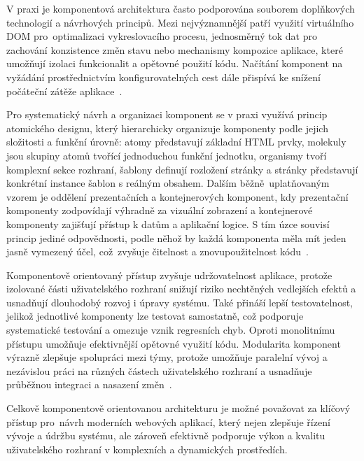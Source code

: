 V praxi je komponentová architektura často podporována souborem doplňkových technologií a návrhových principů. Mezi nejvýznamnější patří využití virtuálního DOM pro~optimalizaci vykreslovacího procesu, jednosměrný tok dat pro zachování konzistence změn stavu nebo mechanismy kompozice aplikace, které umožňují izolaci funkcionalit a opětovné použití kódu. Načítání komponent na vyžádání prostřednictvím konfigurovatelných cest dále přispívá ke snížení počáteční zátěže aplikace~\cite{ComponentArch}.

Pro systematický návrh a organizaci komponent se v praxi využívá princip atomického designu, který hierarchicky organizuje komponenty podle jejich složitosti a funkční úrovně: atomy představují základní HTML prvky, molekuly jsou skupiny atomů tvořící jednoduchou funkční jednotku, organismy tvoří komplexní sekce rozhraní, šablony definují rozložení stránky a stránky představují konkrétní instance šablon s reálným obsahem. Dalším běžně~uplatňovaným vzorem je oddělení prezentačních a kontejnerových komponent, kdy prezentační komponenty zodpovídají výhradně za vizuální zobrazení a kontejnerové komponenty zajišťují přístup k datům a aplikační logice. S tím úzce souvisí princip jediné odpovědnosti, podle něhož by každá 
komponenta měla mít jeden jasně vymezený účel, což~zvyšuje čitelnost 
a znovupoužitelnost kódu~\cite{ComponentDriven}. 

Komponentově orientovaný přístup zvyšuje udržovatelnost aplikace, protože izolované části uživatelského rozhraní snižují riziko nechtěných vedlejších efektů a usnadňují dlouhodobý rozvoj i úpravy systému. Také přináší lepší testovatelnost, jelikož jednotlivé komponenty lze testovat samostatně, což podporuje systematické testování a omezuje vznik regresních chyb. Oproti monolitnímu přístupu umožňuje efektivnější opětovné využití kódu. Modularita komponent výrazně zlepšuje spolupráci mezi týmy, protože umožňuje paralelní vývoj a nezávislou práci na různých částech uživatelského rozhraní a usnadňuje průběžnou integraci a nasazení změn~\cite{ComponentDriven}. 

Celkově komponentově orientovanou architekturu je možné považovat za klíčový přístup pro~návrh moderních webových aplikací, který nejen zlepšuje řízení vývoje a údržbu systému, ale zároveň efektivně podporuje výkon a kvalitu uživatelského rozhraní v komplexních a dynamických prostředích.

